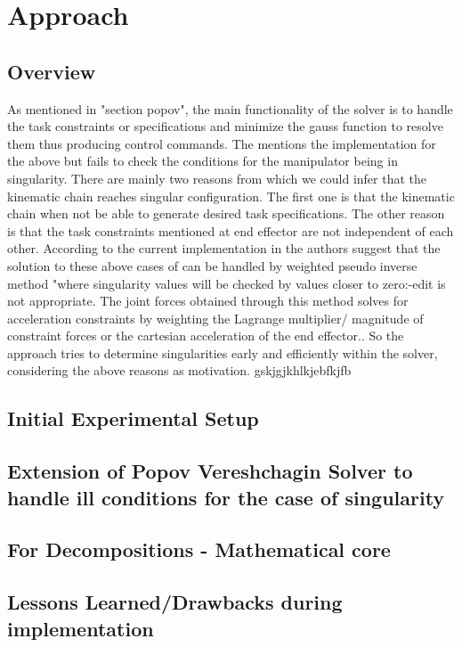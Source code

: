 \chapter{Approach}

\section{Overview}
As mentioned in "section popov", the main functionality of the solver is to handle the task constraints or specifications and minimize the gauss function to resolve them thus producing control commands. The \cite{shakhimardanov2015} mentions the implementation for the above but fails to check the conditions for the manipulator being in singularity. There are mainly two reasons from which we could infer that the kinematic chain reaches singular configuration. The first one is that the kinematic chain when not be able to generate desired task specifications. The other reason is that the task constraints mentioned at end effector are not independent of each other.\cite{shakhimardanov2015} According to the current implementation in \cite{shakhimardanov2015} the authors suggest that the solution to these above cases of can be handled by weighted pseudo inverse method "where singularity values will be checked by values closer to zero:-edit is not appropriate.\cite{Buss2004} The joint forces obtained through this method solves for acceleration constraints by weighting the Lagrange multiplier/ magnitude of constraint forces or the cartesian acceleration of the end effector.\cite{shakhimardanov2015}. So the approach tries to determine singularities early and efficiently within the solver, considering the above reasons as motivation.	
gskjgjkhlkjebfkjfb
\section{Initial Experimental Setup}
\section{Extension of Popov Vereshchagin Solver to handle ill conditions for the case of singularity}
\section{For Decompositions - Mathematical core}

\section{Lessons Learned/Drawbacks during implementation}
